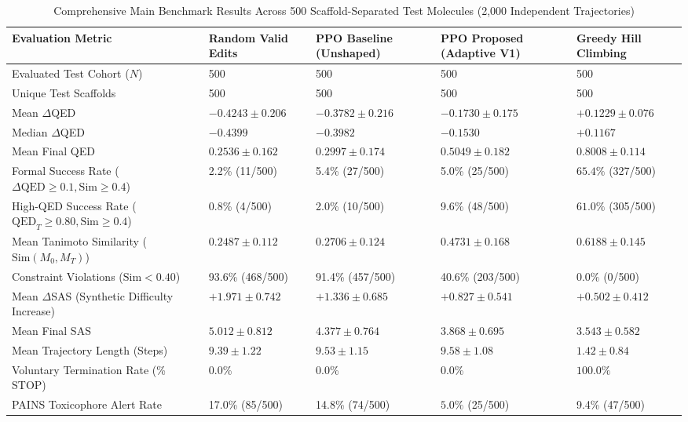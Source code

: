 \documentclass{ieeeaccess}
\begin{document}
\begin{table}[!tbp]
\caption{Comprehensive Main Benchmark Results Across 500 Scaffold-Separated Test Molecules (2,000 Independent Trajectories)}
\label{tab:main_benchmark}
\centering
\footnotesize
\begin{tabularx}{\textwidth}{>{\raggedright\arraybackslash}p{}XXXX}
\toprule
\textbf{Evaluation Metric} & \textbf{Random Valid Edits} & \textbf{PPO Baseline (Unshaped)} & \textbf{PPO Proposed (Adaptive V1)} & \textbf{Greedy Hill Climbing}\\
\midrule
Evaluated Test Cohort ($N$) & 500 & 500 & 500 & 500\\
Unique Test Scaffolds & 500 & 500 & 500 & 500\\
\midrule
Mean $\Delta$QED & $-0.4243 \pm 0.206$ & $-0.3782 \pm 0.216$ & $-0.1730 \pm 0.175$ & $\mathbf{+0.1229 \pm 0.076}$\\
Median $\Delta$QED & $-0.4399$ & $-0.3982$ & $-0.1530$ & $\mathbf{+0.1167}$\\
Mean Final QED & $0.2536 \pm 0.162$ & $0.2997 \pm 0.174$ & $0.5049 \pm 0.182$ & $\mathbf{0.8008 \pm 0.114}$\\
\midrule
Formal Success Rate ($\Delta\text{QED}\ge0.1, \text{Sim}\ge0.4$) & 2.2\% (11/500) & 5.4\% (27/500) & 5.0\% (25/500) & $\mathbf{65.4\%}$ (327/500)\\
High-QED Success Rate ($\text{QED}_T\ge0.80, \text{Sim}\ge0.4$) & 0.8\% (4/500) & 2.0\% (10/500) & 9.6\% (48/500) & $\mathbf{61.0\%}$ (305/500)\\
\midrule
Mean Tanimoto Similarity ($\text{Sim}(M_0, M_T)$) & $0.2487 \pm 0.112$ & $0.2706 \pm 0.124$ & $0.4731 \pm 0.168$ & $\mathbf{0.6188 \pm 0.145}$\\
Constraint Violations ($\text{Sim} < 0.40$) & 93.6\% (468/500) & 91.4\% (457/500) & 40.6\% (203/500) & $\mathbf{0.0\%}$ (0/500)\\
\midrule
Mean $\Delta$SAS (Synthetic Difficulty Increase) & $+1.971 \pm 0.742$ & $+1.336 \pm 0.685$ & $+0.827 \pm 0.541$ & $\mathbf{+0.502 \pm 0.412}$\\
Mean Final SAS & $5.012 \pm 0.812$ & $4.377 \pm 0.764$ & $3.868 \pm 0.695$ & $\mathbf{3.543 \pm 0.582}$\\
\midrule
Mean Trajectory Length (Steps) & $9.39 \pm 1.22$ & $9.53 \pm 1.15$ & $9.58 \pm 1.08$ & $\mathbf{1.42 \pm 0.84}$\\
Voluntary Termination Rate (\% STOP) & 0.0\% & 0.0\% & 0.0\% & $\mathbf{100.0\%}$\\
\midrule
PAINS Toxicophore Alert Rate & 17.0\% (85/500) & 14.8\% (74/500) & $\mathbf{5.0\%}$ (25/500) & 9.4\% (47/500)\\

\end{tabularx}
\end{table}
\end{document}
